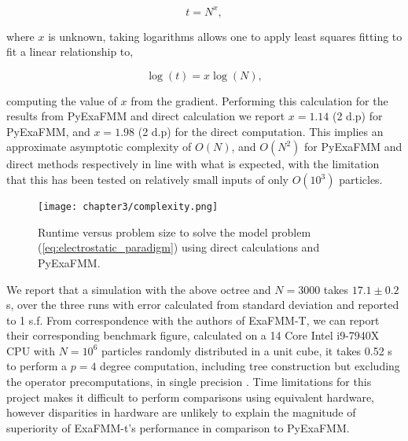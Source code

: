 \begin{equation}
    t = N^x,
\end{equation}

where $x$ is unknown, taking logarithms allows one to apply least squares fitting
to fit a linear relationship to,

\begin{equation}
    \log(t) = x \log(N),
\end{equation}

computing the value of $x$ from the gradient. Performing this calculation for the
results from \gls{PyExaFMM} and direct calculation we report $x=1.14$ (2 d.p) for
\gls{PyExaFMM}, and $x=1.98$ (2 d.p) for the direct computation. This implies an approximate
asymptotic complexity of $O(N)$, and $O(N^2)$ for \gls{PyExaFMM} and direct methods
respectively in line with what is expected, with the limitation that this has
been tested on relatively small inputs of only $O(10^3)$ particles.

\begin{figure}[ht]
    \centering

  {\texttt{[image: chapter3/complexity.png]}}
  \vspace{0pt}
    \caption{
        Runtime versus problem size to solve the model problem
        (\ref{eq:electrostatic_paradigm}) using direct calculations and
        \gls{PyExaFMM}.
    }
    \label{fig:3_1_complexity}
\end{figure}

We report that a simulation with the above octree and
$N=3000$ takes $17.1 \pm 0.2$ s, over the three runs with
error calculated from standard deviation and reported to 1 s.f. From correspondence
with the authors of ExaFMM-T, we can report their corresponding benchmark figure,
calculated on a 14 Core Intel i9-7940X \gls{CPU} with $N=10^6$ particles
randomly distributed in a unit cube, it takes 0.52 s to perform a $p=4$ degree
computation, including tree construction but excluding the
operator precomputations, in single precision \cite{exafmm}. Time limitations for this project
makes it difficult to perform comparisons using equivalent hardware, however
disparities in hardware are unlikely to explain the magnitude of superiority
of ExaFMM-t's performance in comparison to \gls{PyExaFMM}.

